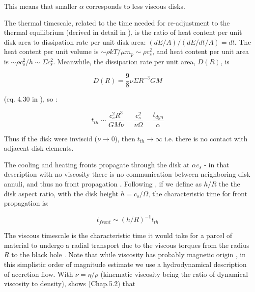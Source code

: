 \documentclass[twocolumn]{aastex62}
\begin{document}
This means that smaller $\alpha$ corresponds to less viscous disks. 


The thermal timescale, related to the time needed for re-adjustment to the thermal equilibrium (derived in detail in \citealt{frank2002}), is the ratio of heat content per unit disk area to dissipation rate per unit disk area: $(dE / A) / (dE/dt /  A) = dt $.  The heat content per unit volume is ${\sim} \rho k T / \mu m_{p} {\sim} \rho c_{s}^{2}$, and heat content per unit area is  ${\sim} \rho c_{s}^{2} / h {\sim} \Sigma c_{s}^{2}$. Meanwhile, the dissipation rate per unit area, $D(R)$, is 

\begin{equation}
D(R) = \frac{9}{8} \nu \Sigma R^{-3} G M
\end{equation}

(eq. 4.30 in \citealt{frank2002}), so :

\begin{equation}
t_{th} {\sim} \frac{c_{s}^{2}R^{3}}{G M \nu } = \frac{c_{s}^{2}}{\nu \Omega} = \frac{t_{dyn}}{\alpha}
\end{equation}

Thus if the disk were inviscid ($\nu \rightarrow 0$), then $t_{th}\rightarrow\infty$ i.e. there is no contact with adjacent disk elements. 

The cooling and heating fronts propagate through the disk at  $\alpha c_{s} $ \citep{hameury2009}  - in that description  with no viscosity there is no communication between neighboring disk annuli, and thus no front propagation \citep{balbus1998, balbus2003}. Following \cite{stern2018}, if we define as $h/R$  the the disk aspect ratio, with the disk height $h = c_{s} / \Omega$, the characteristic time for front propagation is:

\begin{equation}
t_{front} {\sim} (h/R) ^ {-1} t_{th}
\end{equation}


The viscous timescale is the characteristic time it would take for a parcel of material to undergo a radial transport due to the viscous torques from the radius $R$ to the black hole \citep{czerny2006}. Note that while viscosity has probably magnetic origin \citep{eardley1975, grzedzielski2017}, in this simplistic order of magnitude estimate we use a hydrodynamical description of accretion flow.  With $\nu = \eta / \rho$ (kinematic viscosity being the ratio of dynamical viscosity to density), \cite{frank2002} shows (Chap.5.2) that 
\end{document}
